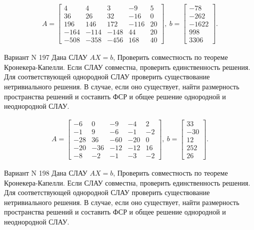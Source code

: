 \documentclass[11pt]{report}
\begin{document}
\begin{align*}
 A = \left[\begin{matrix}4 & 4 & 3 & -9 & 5\\36 & 26 & 32 & -16 & 0\\196 & 146 & 172 & -116 & 20\\-164 & -114 & -148 & 44 & 20\\-508 & -358 & -456 & 168 & 40\end{matrix}\right],
\ b = \left[\begin{matrix}-78\\-262\\-1622\\998\\3306\end{matrix}\right]. 
 \end{align*}

Вариант N 197
Дана СЛАУ $AX = b$,
Проверить совместность по теореме Кронекера-Капелли. Если СЛАУ совместна, проверить единственность решения.
Для соответствующей однородной СЛАУ проверить существование нетривиального решения. В случае, если оно существует,
найти размерность пространства решений и составить ФСР и общее решение однородной  и неоднородной СЛАУ.


\begin{align*}
 A = \left[\begin{matrix}-6 & 0 & -9 & -4 & 2\\-1 & 9 & -6 & -1 & -2\\-28 & 36 & -60 & -20 & 0\\-20 & -36 & -12 & -12 & 16\\-8 & -2 & -1 & -3 & -2\end{matrix}\right],
\ b = \left[\begin{matrix}33\\-30\\12\\252\\26\end{matrix}\right]. 
 \end{align*}

Вариант N 198
Дана СЛАУ $AX = b$,
Проверить совместность по теореме Кронекера-Капелли. Если СЛАУ совместна, проверить единственность решения.
Для соответствующей однородной СЛАУ проверить существование нетривиального решения. В случае, если оно существует,
найти размерность пространства решений и составить ФСР и общее решение однородной  и неоднородной СЛАУ.
\end{document}

